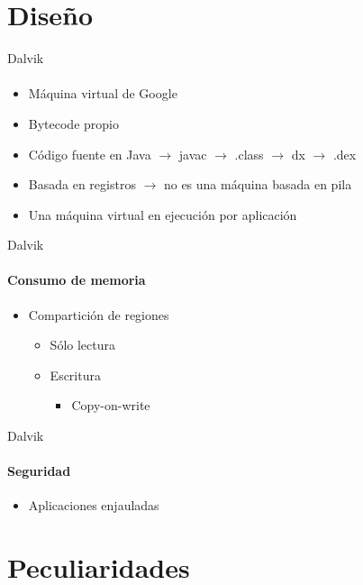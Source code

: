 \documentclass[12pt]{beamer}
\begin{document}
\section{Diseño}

\begin{frame}{Dalvik}
    \framesubtitle{}
    \begin{itemize}
        \item Máquina virtual de Google
        \item Bytecode propio
        \item Código fuente en Java $\rightarrow$ javac $\rightarrow$ .class $\rightarrow$ dx $\rightarrow$ .dex
        \item Basada en registros $\rightarrow$ no es una máquina basada en pila
        \item Una máquina virtual en ejecución por aplicación
    \end{itemize}
\end{frame}

\begin{frame}{Dalvik}
    \framesubtitle{Consumo de memoria}
    \begin{itemize}
        \item Compartición de regiones
        \begin{itemize}
            \item Sólo lectura
            \item Escritura
            \begin{itemize}
                \item Copy-on-write
            \end{itemize}
        \end{itemize}
    \end{itemize}
\end{frame}

\begin{frame}{Dalvik}
    \framesubtitle{Seguridad}
    \begin{itemize}
        \item Aplicaciones enjauladas
    \end{itemize}
\end{frame}

\section{Peculiaridades}
\end{document}

